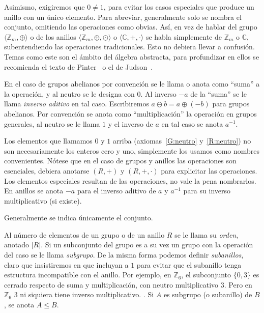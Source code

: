   Asimismo,
  exigiremos que \(0 \ne 1\),
  para evitar los casos especiales
  que produce un anillo con un único elemento.
  Para abreviar,
  generalmente solo se nombra el conjunto,
  omitiendo las operaciones como obvias.
  Así,
  en vez de hablar del grupo \(\langle \mathbb{Z}_m, \oplus \rangle\)
  o de los anillos \(\langle \mathbb{Z}_m, \oplus, \odot \rangle\)
  o \(\langle \mathbb{C}, +, \cdot \rangle\)
  se habla simplemente de \(\mathbb{Z}_m\) o \(\mathbb{C}\),
  subentendiendo las operaciones tradicionales.
  Esto no debiera llevar a confusión.
  Temas como este son el ámbito del álgebra abstracta,%
  para profundizar en ellos se recomienda el texto de Pinter~%
    \cite{pinter10:_book_abstr_algeb}
  o el de Judson~\cite{judson14:_abstr_algeb}.

  En el caso de grupos abelianos%
  por convención se le llama o anota como ``suma'' a la operación,
  y al neutro se le designa con \(0\).
  Al inverso \(-a\)  de la ``suma''
  se le llama \emph{inverso aditivo} en tal caso.%
  Escribiremos \(a \ominus b = a \oplus (-b)\) para grupos abelianos.
  Por convención se anota como ``multiplicación''
  la operación en grupos generales,
  al neutro se le llama \(1\)
  y el inverso de \(a\) en tal caso se anota \(a^{-1}\).

  Los elementos que llamamos \(0\) y \(1\) arriba
  (axiomas~\ref{G:neutro} y~\ref{R:neutro})%
  no son necesariamente los enteros cero y uno,
  simplemente los usamos como nombres convenientes.
  Nótese que en el caso de grupos y anillos las operaciones son esenciales,
  debiera anotarse \((R, +)\) y \((R, +, \cdot)\)
  para explicitar las operaciones.
  Los elementos especiales resultan de las operaciones,
  no vale la pena nombrarlos.
  En anillos se anota \(-a\) para el inverso aditivo de \(a\)
  y \(a^{-1}\) para su inverso multiplicativo
  (si existe).

  Generalmente se indica únicamente el conjunto.

  Al número de elementos de un grupo o de un anillo \(R\)
  se le llama su \emph{orden},%
  anotado \(\lvert R \rvert\).
  Si un subconjunto del grupo es a su vez un grupo con la operación del caso
  se le llama \emph{subgrupo}.%
  De la misma forma podemos definir \emph{subanillos},%
  claro que insistiremos en que incluyan a \(1\)
  para evitar que el subanillo tenga estructura incompatible con el anillo.
  Por ejemplo,
  en \(\mathbb{Z}_6\),
  el subconjunto \(\{0, 3\}\) es cerrado respecto de suma y multiplicación,
  con neutro multiplicativo \(3\).
  Pero en \(\mathbb{Z}_6\) \(3\) ni siquiera tiene inverso multiplicativo.
  .
  Si \(A\) es subgrupo (o subanillo) de \(B\),
  se anota \(A \le B\).

